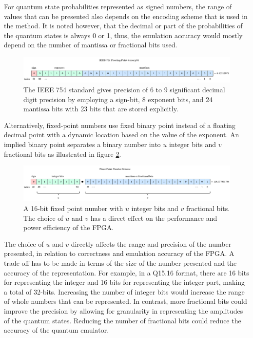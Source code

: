 For quantum state probabilities represented as signed numbers, the range of values that can be presented also depends on the encoding scheme that is used in the method. It is noted however, that the decimal or part of the probabilities of the quantum states is always 0 or 1, thus, the emulation accuracy would mostly depend on the number of mantissa or fractional bits used. 
\begin{figure}[!ht]
	\centering
	\includegraphics[width=\linewidth]{body/ch4/figs/floating-point}
	\caption[Illustrating the IEEE 754-1985 Standard for 32-bit Floating-Point Numbers.]{The IEEE 754 standard gives precision of 6 to 9 significant decimal digit precision by employing a sign-bit, 8 exponent bits, and 24 mantissa bits with 23 bits that are stored explicitly.}
	\label{fig:floating-point}
\end{figure}
Alternatively, fixed-point numbers use fixed binary point instead of a floating decimal point with a dynamic location based on the value of the exponent. An implied binary point separates a binary number into $u$ integer bits and $v$ fractional bits as illustrated in figure \ref{fig:fixed-point}.
\begin{figure}[!ht]
	\centering
	\includegraphics[width=\linewidth]{body/ch4/figs/fixed-point}
	\caption[Illustrating a 32-bit Fixed-Point Scheme.]{A 16-bit fixed point number with $u$ integer bits and $v$ fractional bits. The choice of $u$ and $v$ has a direct effect on the performance and power efficiency of the FPGA.}
	\label{fig:fixed-point}
\end{figure}
The choice of $u$ and $v$ directly affects the range and precision of the number presented, in relation to correctness and emulation accuracy of the FPGA. A trade-off has to be made in terms of the size of the number presented and the accuracy of the representation. For example, in a Q15.16 format, there are 16 bits for representing the integer and 16 bits for representing the integer part, making a total of 32-bits. Increasing the number of integer bits would increase the range of whole numbers that can be represented. In contrast, more fractional bits could improve the precision by allowing for granularity in representing the amplitudes of the quantum states. Reducing the number of fractional bits could reduce the accuracy of the quantum emulator. 

